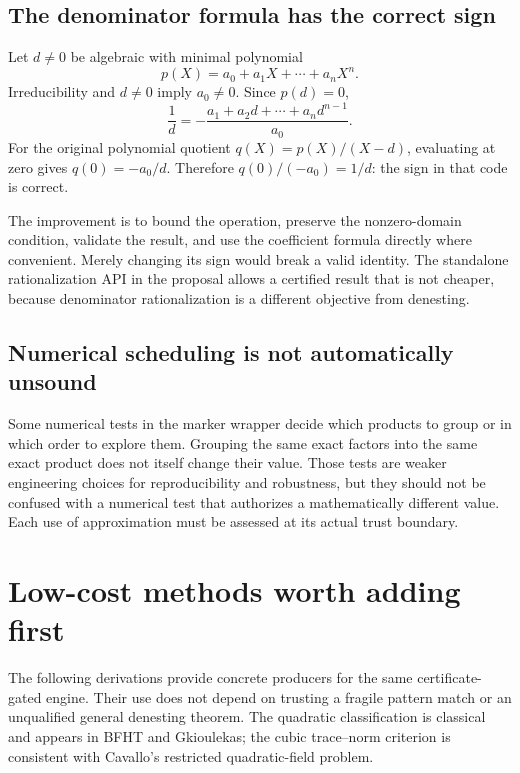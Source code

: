 \documentclass[11pt,letterpaper]{article}
\theoremstyle{definition}
\begin{document}
\subsection{The denominator formula has the correct sign}

Let $d\ne0$ be algebraic with minimal polynomial
\[
 p(X)=a_0+a_1X+\cdots+a_nX^n.
\]
Irreducibility and $d\ne0$ imply $a_0\ne0$. Since $p(d)=0$,
\begin{equation}\label{eq:inverse}
 \frac1d=-\frac{a_1+a_2d+\cdots+a_nd^{n-1}}{a_0}.
\end{equation}
For the original polynomial quotient $q(X)=p(X)/(X-d)$, evaluating at zero gives $q(0)=-a_0/d$. Therefore $q(0)/(-a_0)=1/d$: the sign in that code is correct.

The improvement is to bound the operation, preserve the nonzero-domain condition, validate the result, and use the coefficient formula directly where convenient. Merely changing its sign would break a valid identity. The standalone rationalization API in the proposal allows a certified result that is not cheaper, because denominator rationalization is a different objective from denesting.

\subsection{Numerical scheduling is not automatically unsound}

Some numerical tests in the marker wrapper decide which products to group or in which order to explore them. Grouping the same exact factors into the same exact product does not itself change their value. Those tests are weaker engineering choices for reproducibility and robustness, but they should not be confused with a numerical test that authorizes a mathematically different value. Each use of approximation must be assessed at its actual trust boundary.

\section{Low-cost methods worth adding first}\label{sec:fast}

The following derivations provide concrete producers for the same certificate-gated engine. Their use does not depend on trusting a fragile pattern match or an unqualified general denesting theorem. The quadratic classification is classical and appears in BFHT and Gkioulekas; the cubic trace--norm criterion is consistent with Cavallo's restricted quadratic-field problem.\cite{bfht,gkioulekas,cavallo}
\end{document}
